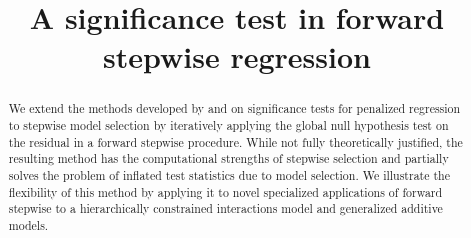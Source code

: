 \documentclass{imsart}
\begin{document}
\begin{frontmatter}

\title{A significance test in forward stepwise regression}




\address{Department of Statistics\\  Stanford University\\ Sequoia
Hall \\390 Serra Mall\\ Stanford, CA 94305, U.S.A.\\ }


\begin{abstract}
  We extend the methods developed by \cite{significance:lasso} and
  \cite{tests:adaptive} on significance tests for penalized
  regression to stepwise model selection by iteratively applying
  the global null hypothesis test on the residual in a forward stepwise
  procedure. While not fully theoretically justified, the resulting method
  has the computational strengths of stepwise selection and partially
  solves the problem of inflated test statistics due to model selection.
  We illustrate the flexibility of this method by applying it to
  novel specialized applications of forward stepwise to a hierarchically
  constrained interactions model and generalized additive models.
\end{abstract}

\begin{keyword}[class=AMS]
\end{keyword}

\begin{keyword}
\end{keyword}

\end{frontmatter}
\end{document}
